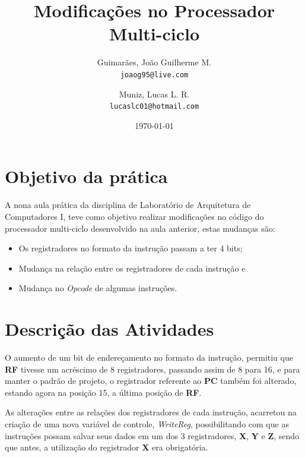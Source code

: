 \documentclass[12pt, a4paper]{article}
\title{\textbf{Modificações no Processador Multi-ciclo}}
\author{
	Guimarães, João Guilherme M.\\
	\texttt{joaog95@live.com}
	\and
	Muniz, Lucas L. R.\\
	\texttt{lucaslc01@hotmail.com}
}
\date{\today}
\begin{document}
	\maketitle
	
	\vspace{1cm}
	
	\section{Objetivo da prática}
	
	\par A nona aula prática da disciplina de Laboratório de Arquitetura de Computadores I, teve como objetivo realizar modificações no código do processador multi-ciclo desenvolvido na aula anterior, estas mudanças são:
	
	\begin{itemize}
		\item Os registradores no formato da instrução passam a ter 4 bits;

		\item Mudança na relação entre os registradores de cada instrução e

		\item Mudança no \textit{Opcode} de algumas instruções.
	\end{itemize}

    \section{Descrição das Atividades}

    \par O aumento de um bit de endereçamento no formato da instrução, permitiu que \textbf{RF} tivesse um acréscimo de 8 registradores, passando assim de 8 para 16, e para manter o padrão de projeto, o registrador referente ao \textbf{PC} também foi alterado, estando agora na posição 15, a última posição de \textbf{RF}.
    
    \vspace{\baselineskip}
    
    \par As alterações entre as relações dos registradores de cada instrução, acarretou na criação de uma nova variável de controle, \textit{WriteReg}, possibilitando com que as instruções possam salvar seus dados em um dos 3 registradores, \textbf{X}, \textbf{Y} e \textbf{Z}, sendo que antes, a utilização do registrador \textbf{X} era obrigatória.
\end{document}

